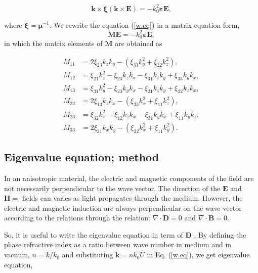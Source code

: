 \documentclass[9pt,twocolumn,twoside]{osajnl}
\begin{document}
   \begin{equation}\label{w.eq}
    \mathbf{k}\times{\boldsymbol{\xi}(\mathbf{k}\times\mathbf{E})}=-k^{2}_{0}\boldsymbol{\varepsilon}\mathbf{E},
\end{equation}

where $\boldsymbol{\xi}=\boldsymbol{\mu}^{-1}$.
We rewrite the equation (\ref{w.eq}) in a matrix equation form, 
\[\mathbf{M}\mathbf{E}=-k_{0}^{2}\boldsymbol{\varepsilon}\mathbf{E}, \] 
in which  the matrix elements of $\mathbf{M}$ are obtained as

\begin{align}
M_{11}&=2\xi_{23}k_{z}k_{y}-(\xi_{33}k_{y}^{2}+\xi_{22}k_{z}^{2}), \nonumber\\
M_{12}&=\xi_{21}k_{z}^{2}-\xi_{23}k_{z}k_{x}-\xi_{31}k_{z}k_{y}+\xi_{33}k_{y}k_{x}, \nonumber\\
M_{13}&=\xi_{31}k_{y}^{2}-\xi_{23}k_{y}k_{x}-\xi_{21}k_{z}k_{y}+\xi_{22}k_{z}k_{x}, \nonumber\\
M_{22}&=2\xi_{13}k_{z}k_{x}-(\xi_{33}k_{x}^{2}+\xi_{11}k_{z}^{2}), \nonumber\\
M_{23}&=\xi_{32}k_{x}^{2}-\xi_{12}k_{z}k_{x}-\xi_{31}k_{y}k_{x}+\xi_{11}k_{y}k_{z},\nonumber\\
M_{33}&=2\xi_{21}k_{x}k_{y}-(\xi_{22}k_{x}^{2}+\xi_{11}k_{y}^{2}).
\end{align}


\subsection{Eigenvalue equation; method}

In an anisotropic material, the electric and magnetic components of the field are not necessarily perpendicular to the wave vector. The direction of the $ \mathbf{E} $ and $\mathbf{H} =$ fields can varies as light propagates through the medium.  However, the electric and magnetic induction are always perpendicular on the wave vector according to the relations through the relation: $\nabla\cdot \mathbf{D} =0 $ and $\nabla\cdot \mathbf{B} =0$.



So, it is useful to write the eigenvalue equation in term of $\mathbf{D}$  \cite{saleh1991fundamentals}. 
By defining the phase refractive index as a ratio between wave number in medium and in vacuum, $n=k/k_{0}$ and substituting $\boldsymbol{k}=nk_{0}\hat{U}$ in Eq. (\ref{w.eq}), we get eigenvalue equation, 
\end{document}
